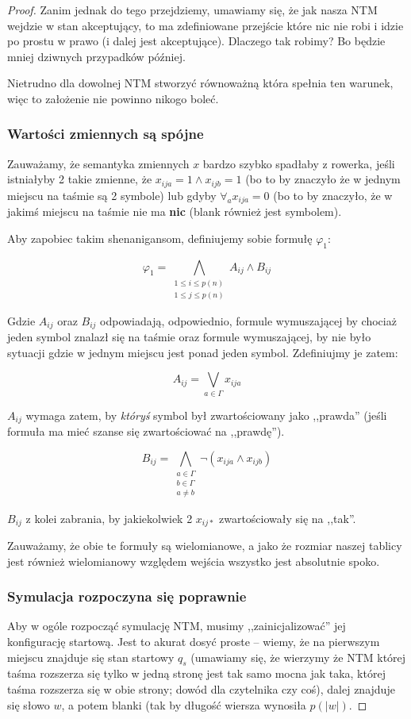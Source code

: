 \begin{proof}
	Zanim jednak do tego przejdziemy, umawiamy się, że jak nasza NTM wejdzie w stan akceptujący, to ma zdefiniowane przejście które nic nie robi i idzie po prostu w prawo (i dalej jest akceptujące). Dlaczego tak robimy? Bo będzie mniej dziwnych przypadków później.

	Nietrudno dla dowolnej NTM stworzyć równoważną która spełnia ten warunek, więc to założenie nie powinno nikogo boleć.

	\subsubsection{Wartości zmiennych są spójne}
	Zauważamy, że semantyka zmiennych \(x\) bardzo szybko spadłaby z rowerka, jeśli istniałyby 2 takie zmienne, że \(x_{ija} = 1 \land x_{ijb} = 1\) (bo to by znaczyło że w jednym miejscu na taśmie są 2 symbole) lub gdyby \( \forall_a x_{ija} = 0\) (bo to by znaczyło, że w jakimś miejscu na taśmie nie ma \textbf{nic} (blank również jest symbolem).

	Aby zapobiec takim shenanigansom, definiujemy sobie formułę \(\varphi_1\):

	\[
		\varphi_1 = \bigwedge_{\substack{1 \leq i \leq p(n) \\ 1 \leq j \leq p(n)}} A_{ij} \land B_{ij}
	\]

	Gdzie \(A_{ij}\) oraz \(B_{ij}\) odpowiadają, odpowiednio, formule wymuszającej by chociaż jeden symbol znalazł się na taśmie oraz formule wymuszającej, by nie było sytuacji gdzie w jednym miejscu jest ponad jeden symbol. Zdefiniujmy je zatem:

	\[
		A_{ij} = \bigvee_{a \in \Gamma} x_{ija}
	\]

	\(A_{ij}\) wymaga zatem, by \textit{któryś} symbol był zwartościowany jako ,,prawda'' (jeśli formuła ma mieć szanse się zwartościować na ,,prawdę'').

	\[
		B_{ij} = \bigwedge_{\substack{a\in\Gamma \\ b\in\Gamma \\ a \not = b}} \neg(x_{ija} \land x_{ijb})
	\]

	\(B_{ij}\) z kolei zabrania, by jakiekolwiek 2 \(x_{ij*}\) zwartościowały się na ,,tak''.

	Zauważamy, że obie te formuły są wielomianowe, a jako że rozmiar naszej tablicy jest również wielomianowy względem wejścia wszystko jest absolutnie spoko.

	\subsubsection{Symulacja rozpoczyna się poprawnie}
	Aby w ogóle rozpocząć symulację NTM, musimy ,,zainicjalizować'' jej konfigurację startową. Jest to akurat dosyć proste -- wiemy, że na pierwszym miejscu znajduje się stan startowy \(q_s\) (umawiamy się, że wierzymy że NTM której taśma rozszerza się tylko w jedną stronę jest tak samo mocna jak taka, której taśma rozszerza się w obie strony; dowód dla czytelnika czy coś), dalej znajduje się słowo \(w\), a potem blanki (tak by długość wiersza wynosiła \(p(|w|)\).


\end{proof}

